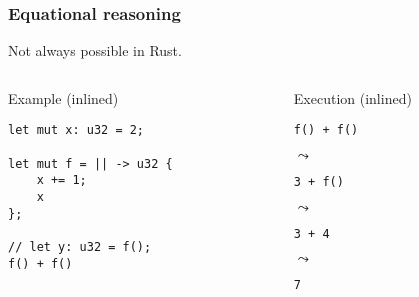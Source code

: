 \documentclass[t]{beamer}
\begin{document}
\begin{frame}[fragile]
\frametitle{Equational reasoning}
Not always possible in Rust.

\begin{columns}

\begin{column}[T]{0.48\textwidth}
\begin{block}{Example (inlined)}
\begin{verbatim}
let mut x: u32 = 2;

let mut f = || -> u32 {
    x += 1;
    x
};

// let y: u32 = f();
f() + f()
\end{verbatim}
\end{block}
\end{column}

\begin{column}[T]{0.48\textwidth}
\begin{block}{Execution (inlined)}
\begin{verbatim}
f() + f()
\end{verbatim}

\(\leadsto\)

\begin{verbatim}
3 + f()
\end{verbatim}

\(\leadsto\)

\begin{verbatim}
3 + 4
\end{verbatim}

\(\leadsto\)

\begin{verbatim}
7
\end{verbatim}
\end{block}
\end{column}

\end{columns}

\end{frame}
\end{document}
